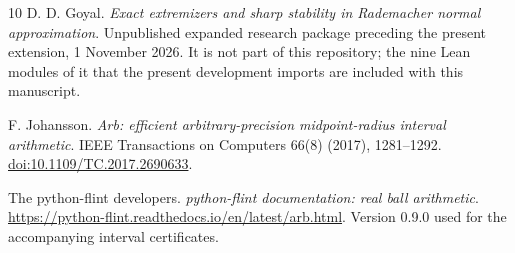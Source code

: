 \documentclass[11pt]{article}
\theoremstyle{remark}\newtheorem{remark}[theorem]{Remark}
\begin{document}
\begin{thebibliography}{10}
 D. D. Goyal.
\emph{Exact extremizers and sharp stability in Rademacher normal approximation}.
Unpublished expanded research package preceding the present extension,
1 November 2026. It is not part of this repository; the nine Lean modules of
it that the present development imports are included with this manuscript.

 F. Johansson.
\emph{Arb: efficient arbitrary-precision midpoint-radius interval arithmetic}.
IEEE Transactions on Computers 66(8) (2017), 1281--1292.
\href{https://doi.org/10.1109/TC.2017.2690633}{doi:10.1109/TC.2017.2690633}.

 The python-flint developers.
\emph{python-flint documentation: real ball arithmetic}.
\url{https://python-flint.readthedocs.io/en/latest/arb.html}.
Version 0.9.0 used for the accompanying interval certificates.
\end{thebibliography}
\end{document}
